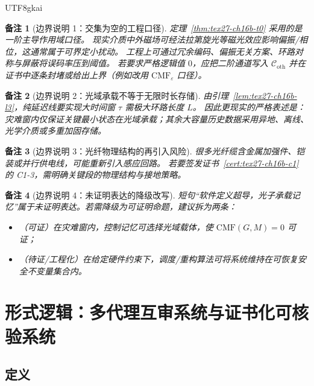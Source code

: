 \documentclass[12pt]{article}
\newtheorem{remark}{备注}[section]
\begin{document}
\begin{CJK*}{UTF8}{gkai}
\begin{remark}[边界说明 1：交集为空的工程口径]
定理~\ref{thm:tex27-ch16b-t0} 采用的是一阶主导作用域口径。
现实介质中外磁场可经法拉第旋光等磁光效应影响偏振/相位，这通常属于可界定小扰动。
工程上可通过冗余编码、偏振无关方案、环路对称与屏蔽将误码率压到阈值。
若要求严格逻辑值 $0$，应把二阶通道写入 $\mathcal{C}_{\mathrm{oth}}$ 并在证书中逐条封堵或给出上界（例如改用 $\mathrm{CMF}_{\varepsilon}$ 口径）。
\end{remark}

\begin{remark}[边界说明 2：光域承载不等于无限时长存储]
由引理~\ref{lem:tex27-ch16b-l3}，纯延迟线要实现大时间窗 $\tau$ 需极大环路长度 $L$。
因此更现实的严格表述是：灾难窗内仅保证关键最小状态在光域承载；其余大容量历史数据采用异地、离线、光学介质或多重加固存储。
\end{remark}

\begin{remark}[边界说明 3：光纤物理结构的再引入风险]
很多光纤缆含金属加强件、铠装或并行供电线，可能重新引入感应回路。
若要签发证书~\ref{cert:tex27-ch16b-c1} 的 C1-3，需明确关键段的物理结构与接地策略。
\end{remark}

\begin{remark}[边界说明 4：未证明表达的降级改写]
短句“软件定义超导，光子承载记忆”属于未证明表达。若需降级为可证明命题，建议拆为两条：
\begin{itemize}
  \item（可证）在灾难窗内，控制记忆可选择光域载体，使 $\mathrm{CMF}(G,M)=0$ 可证；
  \item（待证/工程化）在给定硬件约束下，调度/重构算法可将系统维持在可恢复安全不变量集合内。
\end{itemize}
\end{remark}

\clearpage

\section{形式逻辑：多代理互审系统与证书化可核验系统}
\label{sec:tex27-ch17-formal-logic-ma-ca}

\subsection{定义}
\label{subsec:tex27-ch17-defs}


\end{CJK*}
\end{document}
